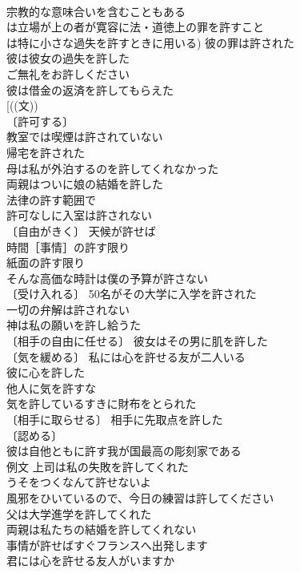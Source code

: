 \documentclass[8pt]{extreport}
\begin{document}
\begin{CJK}{UTF8}{min}
\\	宗教的な意味合いを含むこともある
\\	は立場が上の者が寛容に法・道徳上の罪を許すこと
\\	は特に小さな過失を許すときに用いる) 彼の罪は許された 
\\	彼は彼女の過失を許した 
\\	ご無礼をお許しください 
\\	彼は借金の返済を許してもらえた 
\\	[((文))
\\	〔許可する〕
\\	教室では喫煙は許されていない 
\\	帰宅を許された 
\\	母は私が外泊するのを許してくれなかった 
\\	両親はついに娘の結婚を許した 
\\	法律の許す範囲で 
\\	許可なしに入室は許されない 
\\	〔自由がきく〕 天候が許せば 
\\	時間［事情］の許す限り 
\\	紙面の許す限り 
\\	そんな高価な時計は僕の予算が許さない 
\\	〔受け入れる〕 50名がその大学に入学を許された 
\\	一切の弁解は許されない 
\\	神は私の願いを許し給うた 
\\	〔相手の自由に任せる〕 彼女はその男に肌を許した 
\\	〔気を緩める〕 私には心を許せる友が二人いる 
\\	彼に心を許した 
\\	他人に気を許すな 
\\	気を許しているすきに財布をとられた 
\\	〔相手に取らせる〕 相手に先取点を許した 
\\	〔認める〕
\\	彼は自他ともに許す我が国最高の彫刻家である 
\\	例文 上司は私の失敗を許してくれた 
\\	うそをつくなんて許せないよ 
\\	風邪をひいているので、今日の練習は許してください 
\\	父は大学進学を許してくれた 
\\	両親は私たちの結婚を許してくれない 
\\	事情が許せばすぐフランスへ出発します 
\\	君には心を許せる友人がいますか 

\end{CJK}
\end{document}
